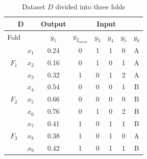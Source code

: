 \documentclass{article}
\begin{document}
\begin{table}[H]
\centering
\begin{tabular}{|cc|c|ccccc|}
\hline
\multicolumn{2}{|c|}{D}                              & Output & \multicolumn{5}{c|}{Input}                                                                                                         \\ \hline
\multicolumn{1}{|c|}{Fold}                   &       & $y_1$  & \multicolumn{1}{c|}{$y_{2_{norm}}$} & \multicolumn{1}{c|}{$y_3$} & \multicolumn{1}{c|}{$y_4$} & \multicolumn{1}{c|}{$y_5$} & $y_6$ \\ \hline
\multicolumn{1}{|c|}{\multirow{3}{*}{$F_1$}} & $x_1$ & 0.24   & \multicolumn{1}{c|}{0}              & \multicolumn{1}{c|}{1}     & \multicolumn{1}{c|}{1}     & \multicolumn{1}{c|}{0}     & A     \\ \cline{2-8} 
\multicolumn{1}{|c|}{}                       & $x_2$ & 0.16   & \multicolumn{1}{c|}{0}              & \multicolumn{1}{c|}{1}     & \multicolumn{1}{c|}{0}     & \multicolumn{1}{c|}{1}     & A     \\ \cline{2-8} 
\multicolumn{1}{|c|}{}                       & $x_3$ & 0.32   & \multicolumn{1}{c|}{1}              & \multicolumn{1}{c|}{0}     & \multicolumn{1}{c|}{1}     & \multicolumn{1}{c|}{2}     & A     \\ \hline
\multicolumn{1}{|c|}{\multirow{3}{*}{$F_2$}} & $x_4$ & 0.54   & \multicolumn{1}{c|}{0}              & \multicolumn{1}{c|}{0}     & \multicolumn{1}{c|}{0}     & \multicolumn{1}{c|}{1}     & B     \\ \cline{2-8} 
\multicolumn{1}{|c|}{}                       & $x_5$ & 0.66   & \multicolumn{1}{c|}{0}              & \multicolumn{1}{c|}{0}     & \multicolumn{1}{c|}{0}     & \multicolumn{1}{c|}{0}     & B     \\ \cline{2-8} 
\multicolumn{1}{|c|}{}                       & $x_6$ & 0.76   & \multicolumn{1}{c|}{0}              & \multicolumn{1}{c|}{1}     & \multicolumn{1}{c|}{0}     & \multicolumn{1}{c|}{2}     & B     \\ \hline
\multicolumn{1}{|c|}{\multirow{3}{*}{$F_3$}} & $x_7$ & 0.41   & \multicolumn{1}{c|}{1}              & \multicolumn{1}{c|}{0}     & \multicolumn{1}{c|}{1}     & \multicolumn{1}{c|}{1}     & B     \\ \cline{2-8} 
\multicolumn{1}{|c|}{}                       & $x_8$ & 0.38   & \multicolumn{1}{c|}{1}              & \multicolumn{1}{c|}{0}     & \multicolumn{1}{c|}{1}     & \multicolumn{1}{c|}{0}     & A     \\ \cline{2-8} 
\multicolumn{1}{|c|}{}                       & $x_9$ & 0.42   & \multicolumn{1}{c|}{1}              & \multicolumn{1}{c|}{0}     & \multicolumn{1}{c|}{1}     & \multicolumn{1}{c|}{1}     & B     \\ \hline
\end{tabular}
\caption{Dataset $D$ divided into three folds}
\label{tab:dataset2_folds}
\end{table}
\end{document}
